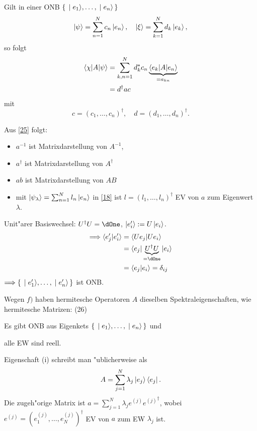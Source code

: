 \documentclass[a4paper]{scrartcl}
\begin{document}
{\begin{aaufz}
\item Gilt in einer ONB $\set{ \ket{e_1}, \ldots, \ket{e_n} }$
\begin{align}
\ket \psi = \sum_{n=1}^N c_n \ket {e_n}, \quad \ket \xi = \sum_{k=1}^N d_k \ket {e_k}, 
\end{align}
so folgt
\begin{align}
\begin{split}
\braket{ \chi | A | \psi } & = \sum_{k,n =1}^N d_k^* c_n \underbrace{\braket{ e_k | A | e_n}}_{=a_{kn}} \\
& = d^\dagger a c
\end{split} \label{25}
\end{align}
mit $$c=(c_1, \ldots, c_n)^\dagger, \quad d = (d_1, \ldots, d_n)^\dagger.$$
\item Aus \ref{25} folgt: \label{f}
\begin{itemize}
\item $a^{-1}$ ist Matrixdarstellung von $A^{-1}$,
\item $a^\dagger$ ist Matrixdarstellung von $A^\dagger$
\item $ab$ ist Matrixdarstellung von $AB$
\item mit $\ket{ \psi_\lambda } = \sum_{n=1}^N l_n \ket{e_n}$ in \ref{18} ist $l = (l_1, \ldots, l_n)^\dagger$ EV von $a$ zum Eigenwert $\lambda$.
\end{itemize}
\item Unit"arer Basiswechsel: $U^\dagger U = \dOne$, $\ket{e_i'} := U \ket{e_i}$. 
\begin{align*}
\Longrightarrow \braket{ e_j' | e_i' } & = \braket{ U e_j | U e_i } \\ 
& = \braket {e_j | \underbrace{U^\dagger U}_{= \dOne} | e_i } \\
& = \braket { e_j | e_i } = \delta_{ij}
\end{align*}
$\Longrightarrow \set{ \ket{ e_1'}, \ldots, \ket{e_n'}}$ ist ONB.

Wegen $f)$ haben hermitesche Operatoren $A$ dieselben Spektraleigenschaften, wie hermitesche Matrizen: (26)
\begin{iaufz}
\item Es gibt ONB aus Eigenkets $\set{ \ket{e_1}, \ldots, \ket{e_n}}$ und
\item alle EW sind reell.
\end{iaufz}
\setcounter{equation}{26}
\end{aaufz}
Eigenschaft (i) schreibt man "ublicherweise als 
\begin{align}
A = \sum_{j=1}^N \lambda_j \ket {e_j} \bra{e_j}.
\end{align}
Die zugeh"orige Matrix ist $a = \sum_{j=1}^N \lambda_j e^{(j)}  {e^{(j)}}^\dagger$, wobei $e^{(j)} = (e_1^{(j)}, \ldots, e_N^{(j)})^\dagger$ EV von $a$ zum EW $\lambda_j$ ist.

}
\end{document}
